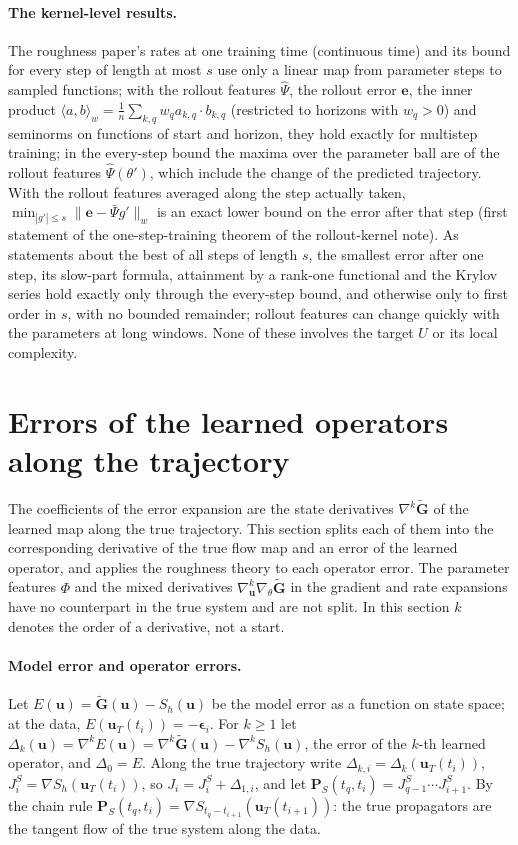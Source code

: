 \documentclass[11pt]{article}
\theoremstyle{definition}
\theoremstyle{remark}
\newcommand{\uu}{\mathbf{u}}
\newcommand{\ee}{\mathbf{e}}
\newcommand{\Gt}{\tilde{\mathbf{G}}}
\newcommand{\eps}{\bm{\epsilon}}
\newcommand{\Pp}{\mathbf P}
\newcommand{\Psih}{\hat\Psi}
\begin{document}
\paragraph{The kernel-level results.}
The roughness paper's rates at one training time (continuous time) and its bound for every step of length at most $s$ use only a linear map from parameter steps to sampled functions; with the rollout features $\Psih$, the rollout error $\ee$, the inner product $\langle a,b\rangle_w=\frac1n\sum_{k,q}w_qa_{k,q}\cdot b_{k,q}$ (restricted to horizons with $w_q>0$) and seminorms on functions of start and horizon, they hold exactly for multistep training; in the every-step bound the maxima over the parameter ball are of the rollout features $\Psih(\theta')$, which include the change of the predicted trajectory.
With the rollout features averaged along the step actually taken, $\min_{|g'|\le s}\|\ee-\bar\Psi g'\|_w$ is an exact lower bound on the error after that step (first statement of the one-step-training theorem of the rollout-kernel note).
As statements about the best of all steps of length $s$, the smallest error after one step, its slow-part formula, attainment by a rank-one functional and the Krylov series hold exactly only through the every-step bound, and otherwise only to first order in $s$, with no bounded remainder; rollout features can change quickly with the parameters at long windows.
None of these involves the target $U$ or its local complexity.

\section{Errors of the learned operators along the trajectory}\label{sec:operators}

The coefficients of the error expansion are the state derivatives $\nabla^k\Gt$ of the learned map along the true trajectory.
This section splits each of them into the corresponding derivative of the true flow map and an error of the learned operator, and applies the roughness theory to each operator error.
The parameter features $\Phi$ and the mixed derivatives $\nabla^k_\uu\nabla_\theta\Gt$ in the gradient and rate expansions have no counterpart in the true system and are not split.
In this section $k$ denotes the order of a derivative, not a start.

\paragraph{Model error and operator errors.}
Let $E(\uu)=\Gt(\uu)-S_h(\uu)$ be the model error as a function on state space; at the data, $E(\uu_T(t_i))=-\eps_i$.
For $k\ge1$ let $\Delta_k(\uu)=\nabla^kE(\uu)=\nabla^k\Gt(\uu)-\nabla^kS_h(\uu)$, the error of the $k$-th learned operator, and $\Delta_0=E$.
Along the true trajectory write $\Delta_{k,i}=\Delta_k(\uu_T(t_i))$, $J^S_i=\nabla S_h(\uu_T(t_i))$, so $J_i=J^S_i+\Delta_{1,i}$, and let $\Pp_S(t_q,t_i)=J^S_{q-1}\cdots J^S_{i+1}$.
By the chain rule $\Pp_S(t_q,t_i)=\nabla S_{t_q-t_{i+1}}(\uu_T(t_{i+1}))$: the true propagators are the tangent flow of the true system along the data.
\end{document}
